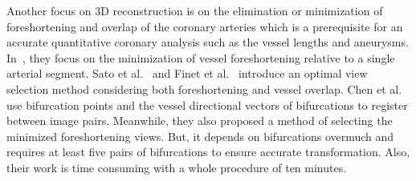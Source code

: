 Another focus on 3D reconstruction is on the elimination or
minimization of foreshortening and overlap of the coronary arteries
which is a prerequisite for an accurate quantitative coronary analysis
such as the vessel lengths and aneurysms. In~\cite{opti_view1},
they focus on the minimization of vessel foreshortening relative to
a single arterial segment. Sato et al.~\cite{opti_view2} and
Finet et al.~\cite{opti_view3} introduce an
optimal view selection method considering both foreshortening and
vessel overlap. Chen et al.~\cite{James_Chen} use bifurcation points
and the vessel directional vectors of bifurcations to register between image
pairs. Meanwhile, they also proposed a method of selecting
the minimized foreshortening views. But, it depends on bifurcations
overmuch and requires at least five pairs of bifurcations to ensure
accurate transformation. Also, their work is time consuming with a
whole procedure of ten minutes.
